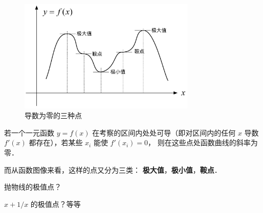 
\begin{figure}[ht]
\vskip-10pt
\centering
\includegraphics[width=0.75\textwidth]{./figures/DerMax.pdf}
\caption{导数为零的三种点} %
\end{figure}

若一个一元函数 $y = f(x)$ 在考察的区间内处处可导（即对区间内的任何 $x$ 导数 $f'(x)$ 都存在），若某些 $x_i$ 能使 $f'(x_i) = 0$， 则在这些点处函数曲线的斜率为零．

而从函数图像来看，这样的点又分为三类： \textbf{极大值}，\textbf{极小值}，\textbf{鞍点}．

\begin{exam}{}
抛物线的极值点？%

$x+1/x$ 的极值点？等等%
\end{exam}













